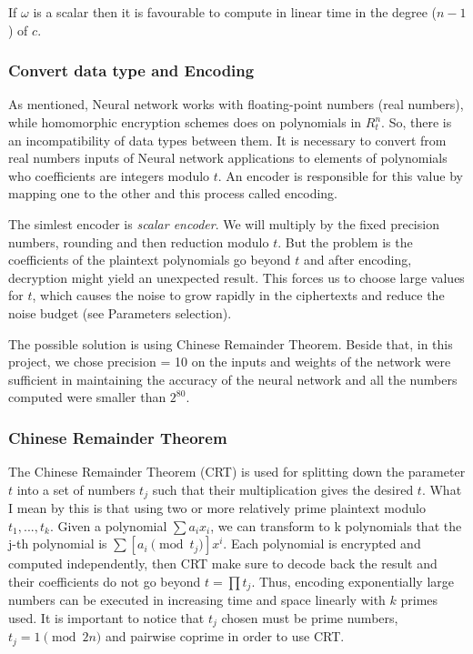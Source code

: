 \documentclass[A4paper,12pt]{article}
\begin{document}
If $\omega$ is a scalar then it is favourable to compute in linear time in the degree ($n - 1$) of $c$.

	\subsubsection{Convert data type and Encoding}
As mentioned, Neural network works with floating-point numbers (real numbers), while homomorphic encryption schemes does on polynomials in $R_t^n$. So, there is an incompatibility of data types between them. It is necessary to convert from real numbers inputs of Neural network applications to elements of polynomials who coefficients are integers modulo $t$. An encoder is responsible for this value by mapping one to the other and this process called encoding.

The simlest encoder is \textit{scalar encoder}. We will multiply by the fixed precision numbers, rounding and then reduction modulo $t$. But the problem is the coefficients of the plaintext polynomials go beyond $t$ and after encoding, decryption might yield an unexpected result. This forces us to choose large values for $t$, which causes the noise to grow rapidly in the ciphertexts and reduce the noise budget (see Parameters selection).

The possible solution is using Chinese Remainder Theorem. Beside that, in this project, we chose precision = 10 on the inputs and weights of the network were sufficient in maintaining the accuracy of the neural network and all the numbers computed were smaller than $2^{80}$.

	\subsubsection{Chinese Remainder Theorem}
	
The Chinese Remainder Theorem (CRT)\cite{report} is used for splitting down the parameter $t$ into a set of numbers $t_j$ such that their multiplication gives the desired $t$. What I mean by this is that using two or more relatively prime plaintext modulo $t_1, ..., t_k$. Given a polynomial $\sum a_i x_i$, we can transform to k polynomials that the j-th polynomial is $\sum [a_i \pmod {t_j}]x^i$. Each polynomial is encrypted and computed independently, then CRT make sure to decode back the result and their coefficients do not go beyond $t = \prod {t_j}$. Thus, encoding exponentially large numbers can be executed in increasing time and space linearly with $k$ primes used. It is important to notice that $t_j$ chosen must be prime numbers, $t_j = 1 \pmod {2n}$ and pairwise coprime in order to use CRT.
	
\end{document}
